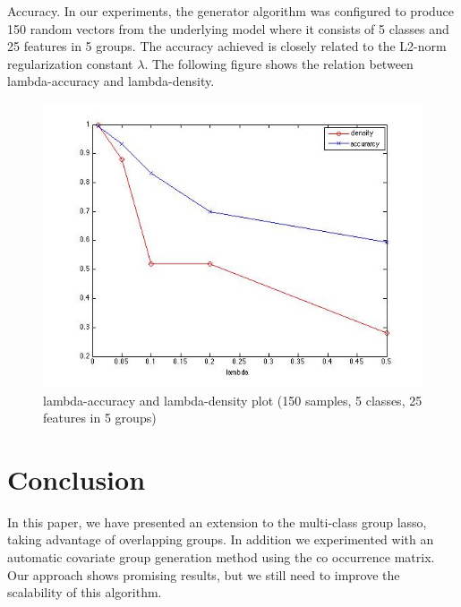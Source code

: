 \documentclass[11pt]{article}
\begin{document}
Accuracy. In our experiments, the generator algorithm was configured to produce 150 random vectors from the underlying model where it consists of 5 classes and 25 features in 5 groups. The accuracy achieved is closely related to the L2-norm regularization constant $\lambda$. The following figure shows the relation between lambda-accuracy and lambda-density.\\

\begin{figure}[ht]
\begin{center}
	\includegraphics[width=\linewidth]{m3_img}
	\caption{lambda-accuracy and lambda-density plot (150 samples, 5 classes, 25 features in 5 groups)}
\end{center}
\end{figure}




\section{Conclusion}
In this paper, we have presented an extension to the multi-class group lasso,
taking advantage of overlapping groups. In addition we experimented with 
an automatic covariate group generation method using the co occurrence matrix.
Our approach shows promising results, but we still need to improve the 
scalability of this algorithm.





\end{document}
